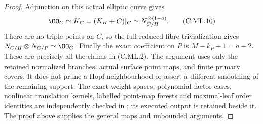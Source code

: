 \begin{proof}
Adjunction on this actual elliptic curve gives
\[
     \OO_C\simeq K_C=(K_H+C)|_C
                          \simeq N_{C/H}^{\otimes(1-a)}.
\tag{C.ML.10}
\]
There are no triple points on \(C\), so the
full reduced-fibre trivialization gives
\(N_{C/H}\otimes N_{C/P}\simeq\OO_C\).
Finally the exact coefficient on \(P\) is
\(M-k_P-1=a-2\). These are precisely all the
claims in (C.ML.2). The argument uses only the
retained normalized branches, actual surface
point maps, and finite primary covers. It
does not prune a Hopf neighbourhood or assert
a different smoothing of the remaining support.
The exact weight spaces, polynomial factor cases,
nonlinear translation kernels, labelled point-map
forests and maximal-leaf order identities are
independently checked in
; its executed
output is retained beside it. The proof above supplies
the general maps and unbounded arguments.
\end{proof}
